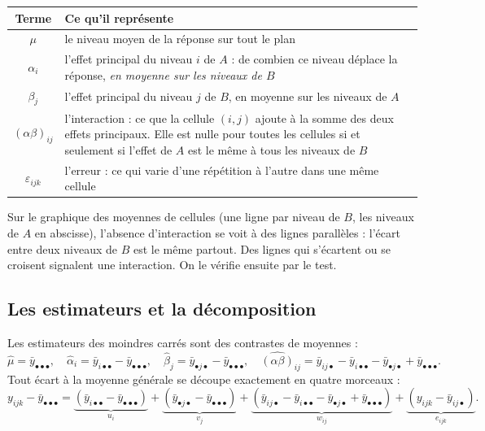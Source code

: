\documentclass[11pt,a4paper]{article}
\theoremstyle{sj}
\theoremstyle{definition}
\theoremstyle{remark}
\newcommand{\ybar}{\bar y}
\newcommand{\dotp}{{\scriptscriptstyle\bullet}}
\begin{document}
\begin{center}
\begin{tabularx}{\textwidth}{c X}
\toprule
\textbf{Terme} & \textbf{Ce qu'il représente}\\
\midrule
$\mu$ & le niveau moyen de la réponse sur tout le plan\\
$\alpha_i$ & l'effet principal du niveau $i$ de $A$ : de combien ce niveau déplace la réponse, \emph{en moyenne sur les niveaux de $B$}\\
$\beta_j$ & l'effet principal du niveau $j$ de $B$, en moyenne sur les niveaux de $A$\\
$(\alpha\beta)_{ij}$ & l'interaction : ce que la cellule $(i,j)$ ajoute à la somme des deux effets principaux. Elle est nulle pour toutes les cellules si et seulement si l'effet de $A$ est le même à tous les niveaux de $B$\\
$\varepsilon_{ijk}$ & l'erreur : ce qui varie d'une répétition à l'autre dans une même cellule\\
\bottomrule
\end{tabularx}
\end{center}

\begin{essentiel}
Sur le graphique des moyennes de cellules (une ligne par niveau de $B$, les niveaux de $A$ en abscisse), l'absence d'interaction se voit à des lignes parallèles : l'écart entre deux niveaux de $B$ est le même partout. Des lignes qui s'écartent ou se croisent signalent une interaction. On le vérifie ensuite par le test.
\end{essentiel}

\subsection{Les estimateurs et la décomposition}

Les estimateurs des moindres carrés sont des contrastes de moyennes :
\[
\hat\mu=\ybar_{\dotp\dotp\dotp},\quad \hat\alpha_i=\ybar_{i\dotp\dotp}-\ybar_{\dotp\dotp\dotp},\quad \hat\beta_j=\ybar_{\dotp j\dotp}-\ybar_{\dotp\dotp\dotp},\quad \widehat{(\alpha\beta)}_{ij}=\ybar_{ij\dotp}-\ybar_{i\dotp\dotp}-\ybar_{\dotp j\dotp}+\ybar_{\dotp\dotp\dotp}.
\]
Tout écart à la moyenne générale se découpe exactement en quatre morceaux :
\begin{equation}\label{eq:ecart}
y_{ijk}-\ybar_{\dotp\dotp\dotp}=\underbrace{(\ybar_{i\dotp\dotp}-\ybar_{\dotp\dotp\dotp})}_{u_i}+\underbrace{(\ybar_{\dotp j\dotp}-\ybar_{\dotp\dotp\dotp})}_{v_j}+\underbrace{(\ybar_{ij\dotp}-\ybar_{i\dotp\dotp}-\ybar_{\dotp j\dotp}+\ybar_{\dotp\dotp\dotp})}_{w_{ij}}+\underbrace{(y_{ijk}-\ybar_{ij\dotp})}_{e_{ijk}}.
\end{equation}
\end{document}
